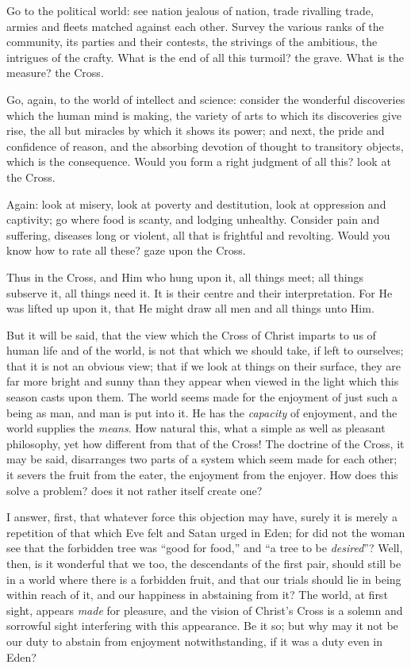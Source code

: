 Go to the political world: see nation jealous of
nation, trade rivalling trade, armies and fleets matched
against each other. Survey the various ranks of the
community, its parties and their contests, the strivings
of the ambitious, the intrigues of the crafty. What is
the end of all this turmoil? the grave. What is the
measure? the Cross.

Go, again, to the world of intellect and science:
consider the wonderful discoveries which the human mind
is making, the variety of arts to which its discoveries
give rise, the all but miracles by which it shows its
power; and next, the pride and confidence of reason, and
the absorbing devotion of thought to transitory objects,
which is the consequence. Would you form a right judgment
of all this? look at the Cross.

Again: look at misery, look at poverty and
destitution, look at oppression and captivity; go where
food is scanty, and lodging unhealthy. Consider pain and
suffering, diseases long or violent, all that is
frightful and revolting. Would you know how to rate all
these? gaze upon the Cross.

Thus in the Cross, and Him who hung upon it, all
things meet; all things subserve it, all things need it.
It is their centre and their interpretation. For He was
lifted up upon it, that He might draw all men and all
things unto Him.

But it will be said, that the view which the Cross of
Christ imparts to us of human life and of the world, is
not that which we should take, if left to ourselves; that
it is not an obvious view; that if we look at things on
their surface, they are far more bright and sunny than
they appear when viewed in the light which this season
casts upon them. The world seems made for the enjoyment
of just such a being as man, and man is put into it. He
has the \emph{capacity} of enjoyment, and the world supplies the \emph{means}. How natural this, what a simple as well as
pleasant philosophy, yet how different from that of the Cross! The doctrine of the Cross, it may be said,
disarranges two parts of a system which seem made for
each other; it severs the fruit from the eater, the
enjoyment from the enjoyer. How does this solve a
problem? does it not rather itself create one?

I answer, first, that whatever force this objection
may have, surely it is merely a repetition of that which
Eve felt and Satan urged in Eden; for did not the woman
see that the forbidden tree was ``good for
food,'' and ``a tree to be \emph{desired}''? Well,
then, is it wonderful that we too, the descendants of the
first pair, should still be in a world where there is a
forbidden fruit, and that our trials should lie in being
within reach of it, and our happiness in abstaining from
it? The world, at first sight, appears \emph{made} for pleasure,
and the vision of Christ's Cross is a solemn and
sorrowful sight interfering with this appearance. Be it
so; but why may it not be our duty to abstain from
enjoyment notwithstanding, if it was a duty even in Eden?

